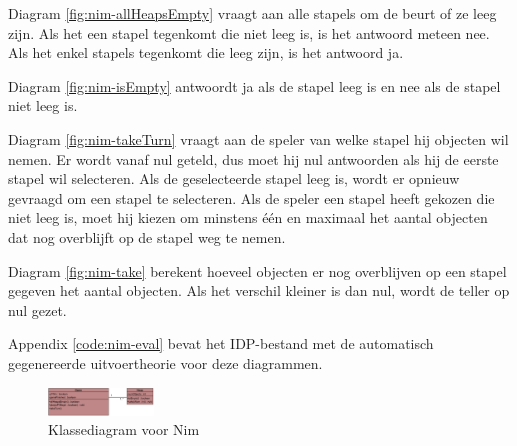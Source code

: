 Diagram \ref{fig:nim-allHeapsEmpty} vraagt aan alle stapels om de beurt of ze leeg zijn. Als het een stapel tegenkomt die niet leeg is, is het antwoord meteen nee. Als het enkel stapels tegenkomt die leeg zijn, is het antwoord ja.

Diagram \ref{fig:nim-isEmpty} antwoordt ja als de stapel leeg is en nee als de stapel niet leeg is.

Diagram \ref{fig:nim-takeTurn} vraagt aan de speler van welke stapel hij objecten wil nemen. Er wordt vanaf nul geteld, dus moet hij nul antwoorden als hij de eerste stapel wil selecteren. Als de geselecteerde stapel leeg is, wordt er opnieuw gevraagd om een stapel te selecteren. Als de speler een stapel heeft gekozen die niet leeg is, moet hij kiezen om minstens \'e\'en en maximaal het aantal objecten dat nog overblijft op de stapel weg te nemen.

Diagram \ref{fig:nim-take} berekent hoeveel objecten er nog overblijven op een stapel gegeven het aantal objecten. Als het verschil kleiner is dan nul, wordt de teller op nul gezet.

Appendix \ref{code:nim-eval} bevat het IDP-bestand met de automatisch gegenereerde uitvoertheorie voor deze diagrammen.

\begin{figure}[h]
	\centering
	\includegraphics[width=0.25\textwidth]{chap-evaluatie/ClassDiagram1.png}
	\caption{Klassediagram voor Nim}
	\label{fig:nim-cd}
\end{figure}

